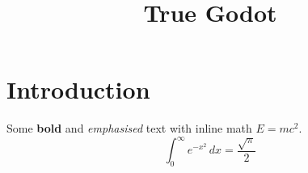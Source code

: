 \documentclass[11pt]{article}
\title{True Godot}
\begin{document}
\maketitle
\section{Introduction}
Some \textbf{bold} and \emph{emphasised} text with inline math $E = mc^2$.
\begin{equation}
  \int_0^\infty e^{-x^2}\,dx = \frac{\sqrt{\pi}}{2}
\end{equation}
\end{document}
